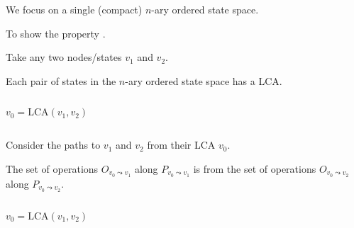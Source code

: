 
\begin{frame}{}
  \centerline{}
\end{frame}

\begin{frame}{}
  \begin{center}
    {\large We focus on a single (compact) $n$-ary ordered state space.}
  \end{center}


  \begin{center}
    {\large To show the  property .}
  \end{center}
\end{frame}

\begin{frame}{}
  \centerline{ Take any two nodes/states $v_1$ and $v_2$.}

  \begin{lemma}
    Each pair of states in the $n$-ary ordered state space has a  LCA.
  \end{lemma}

  \begin{columns}
	\[
	  v_0 = \text{LCA}(v_1, v_2)
	\]
  \end{columns}
\end{frame}

\begin{frame}{}
  \centerline{ Consider the paths to $v_1$ and $v_2$ from their LCA $v_0$.}

  \begin{lemma}
    The set of operations $O_{v_0 \leadsto v_1}$ along $P_{v_0 \leadsto v_1}$ 
    is  from the set of operations $O_{v_0 \leadsto v_2}$ along $P_{v_0 \leadsto v_2}$.
  \end{lemma}

  \begin{columns}
	\[
	  v_0 = \text{LCA}(v_1, v_2)
	\]
  \end{columns}
\end{frame}

